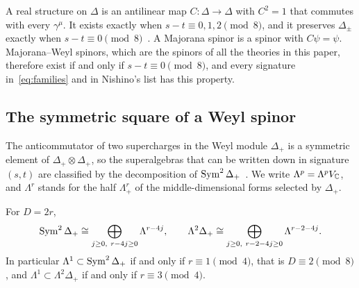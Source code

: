 A real structure on $\Delta$ is an antilinear map $C:\Delta\to\Delta$ with $C^2=1$ that commutes with every $\gamma^\mu$. It exists exactly when $s-t\equiv0,1,2\pmod 8$, and it preserves $\Delta_\pm$ exactly when $s-t\equiv0\pmod 8$~\cite{LawsonMichelsohn1989,Deligne1999,VanProeyen1999}. A Majorana spinor is a spinor with $C\psi=\psi$. Majorana--Weyl spinors, which are the spinors of all the theories in this paper, therefore exist if and only if $s-t\equiv 0\pmod 8$, and every signature in~\eqref{eq:families} and in Nishino's list has this property.

\subsection{The symmetric square of a Weyl spinor}

The anticommutator of two supercharges in the Weyl module $\Delta_+$ is a symmetric element of $\Delta_+\otimes\Delta_+$, so the superalgebras that can be written down in signature $(s,t)$ are classified by the decomposition of $\operatorname{Sym}^2\Delta_+$~\cite{vanHoltenVanProeyen1982,DAuriaFerraraLledoVaradarajan2001}. We write $\Lambda^p=\Lambda^pV_{\mathbb{C}}$, and $\Lambda^r$ stands for the half $\Lambda^r_+$ of the middle-dimensional forms selected by $\Delta_+$.

\begin{proposition}
\label{prop:sym2}
For $D=2r$,
\begin{equation}
\label{eq:sym2}
\Sym^2\Delta_+\cong\bigoplus_{j\ge0,\ r-4j\ge0}\Lambda^{r-4j},\qquad \Lambda^2\Delta_+\cong\bigoplus_{j\ge0,\ r-2-4j\ge0}\Lambda^{r-2-4j}.
\end{equation}
In particular $\Lambda^1\subset\operatorname{Sym}^2\Delta_+$ if and only if $r\equiv1\pmod 4$, that is $D\equiv2\pmod 8$, and $\Lambda^1\subset\Lambda^2\Delta_+$ if and only if $r\equiv3\pmod 4$.
\end{proposition}

